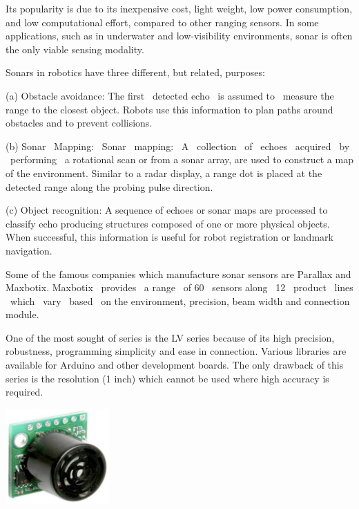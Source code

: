 \documentclass[letterpaper]{article}
\begin{document}
\bigskip

{
Its popularity is due to its inexpensive cost, light weight, low power
consumption, and low computational effort, compared to other ranging
sensors. In some applications, such as in underwater and
low{}-visibility environments, sonar is often the only viable sensing
modality.}


\bigskip

{
Sonars in robotics have three different, but related, purposes:}


\bigskip

{
(a) Obstacle avoidance: The first \ detected echo \ is assumed to
\ measure the range to the closest object. Robots use this information
to plan paths around obstacles and to prevent collisions.}

{
(b) Sonar \ Mapping: \ Sonar \ mapping: \ A \ collection \ of \ echoes
\ acquired \ by \ performing \ a rotational scan or from a sonar array,
are used to construct a map of the environment. Similar to a radar
display, a range dot is placed at the detected range along the probing
pulse direction.}

{
(c) Object recognition: A sequence of echoes or sonar maps are processed
to classify echo producing structures composed of one or more physical
objects. When successful, this information is useful for robot
registration or landmark navigation.}

\clearpage\setcounter{page}{1}\pagestyle{Convertedi}
{
Some of the famous companies which manufacture sonar sensors are
Parallax and Maxbotix. Maxbotix \ provides \ a range \ of 60 \ sensors
along \ 12 \ product \ lines \ which \ vary \ based \ on the
environment, precision, beam width and connection module.}


\bigskip

{
One of the most sought of series is the LV series because of its high
precision, robustness, programming simplicity and ease in connection.
Various libraries are available for Arduino and other development
boards. The only drawback of this series is the resolution (1 inch)
which cannot be used where high accuracy is required.}


\bigskip

 \includegraphics[width=3.969cm,height=3.625cm]{III-img2.png} 
\end{document}
